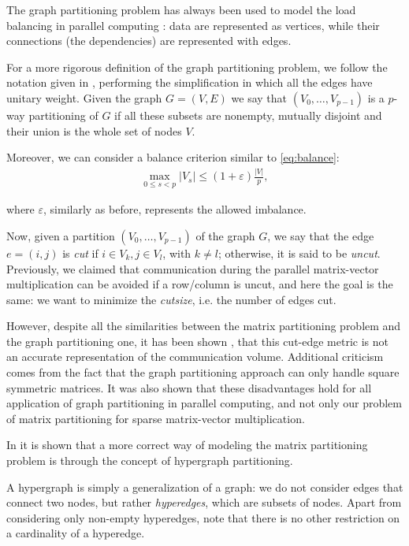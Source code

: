 The graph partitioning problem has always been used to model the load balancing in parallel computing \cite{parallel_hypergraph}: data are represented as vertices, while their connections (the dependencies) are represented with edges. 

For a more rigorous definition of the graph partitioning problem, we follow the notation given in \cite{hypergraph_model},  performing the simplification in which all the edges have unitary weight. Given the graph $G=(V,E)$ we say that $(V_0,\dots,V_{p-1})$ is a $p$-way partitioning of $G$ if all these subsets are nonempty, mutually disjoint and their union is the whole set of nodes $V$. 

Moreover, we can consider a balance criterion similar to \eqref{eq:balance}:
\begin{align}
	\max_{0\leq s <p}	|V_s| \leq (1+\varepsilon)\frac{|V|}{p},
	\label{eq:balance_hypergraph}
\end{align}

where $\varepsilon$, similarly as before, represents the allowed imbalance.

Now, given a partition $(V_0,\dots,V_{p-1})$ of the graph $G$, we say that the edge $e=(i,j)$ is \emph{cut} if $i \in V_k, j \in V_l$, with $k \neq l$; otherwise, it is said to be \emph{uncut}. Previously, we claimed that communication during the parallel matrix-vector multiplication can be avoided if a row/column is uncut, and here the goal is the same: we want to minimize the \emph{cutsize}, i.e. the number of edges cut.

However, despite all the similarities between the matrix partitioning problem and the graph partitioning one, it has been shown \cite{hypergraph_model}\cite{zoltan_worth-it},  that this cut-edge metric is not an accurate representation of the communication volume. Additional criticism \cite{hendrickson_emperor} comes from the fact that the graph partitioning approach can only handle square symmetric matrices. It was also shown \cite{hendrickson_kolda} that these disadvantages hold for all application of graph partitioning in parallel computing, and not only our problem of matrix partitioning for sparse matrix-vector multiplication. 

In \cite{hypergraph_model} it is shown that a more correct way of modeling the matrix partitioning problem is through the concept of hypergraph partitioning.

A hypergraph is simply a generalization of a graph: we do not consider edges that connect two nodes, but rather \emph{hyperedges}, which are subsets of nodes. Apart from considering only non-empty hyperedges, note that there is no other restriction on a cardinality of a hyperedge.

